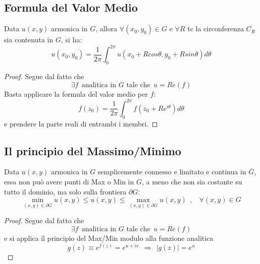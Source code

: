 \documentclass[twoside]{article}
\begin{document}
\subsection{Formula del Valor Medio}
Data $u(x,y)$ armonica in $G$, allora $\forall (x_0,y_0) \in G$ e $\forall R$ tc la circonferenza $C_R$ sia contenuta in $G$, si ha:
\begin{equation}
    u(x_0,y_0)=\frac{1}{2\pi}\int_{0}^{2\pi}u(x_0 + Rcos\theta , y_0 + Rsin\theta) d\theta
\end{equation}

\begin{proof}
Segue dal fatto che 
\begin{equation}
    \exists f \ \ \text{analitica in $G$ tale che} \ \ u=Re(f)
\end{equation}
Basta applicare la formula del valor medio per $f$:
\begin{equation}
    f(z_0)=\frac{1}{2\pi}\int_0 ^{2\pi} f(z_0+Re^{i\theta})d\theta
\end{equation}
e prendere la parte reali di entrambi i membri.

\end{proof}

\subsection{Il principio del Massimo/Minimo}

Data $u(x,y)$ armonica in $G$ semplicemente connesso e limitato e continua in $\bar{G}$, essa non può avere punti di Max o Min in $G$, a meno che non sia costante su tutto il dominio, ma solo sulla frontiera $\partial G$:
\begin{equation}
    \min_{(x,y)\in \partial G} u(x,y)\le u(x,y) \le \max_{(x,y)\in \partial G} u(x,y) \ \ , \ \ \ \ \forall (x,y) \in G
\end{equation}

\begin{proof}
Segue dal fatto che
\begin{equation}
    \exists f \ \ \text{analitica in $G$ tale che} \ \ u=Re(f)
\end{equation}
e si applica il principio del Max/Min modulo alla funzione analitica 
\begin{equation}
g(z)\equiv e^{f(z)}=e^{u+iv} \ \ \Rightarrow \ \ |g(z)|=e^u
\end{equation}

\end{proof}
\end{document}
